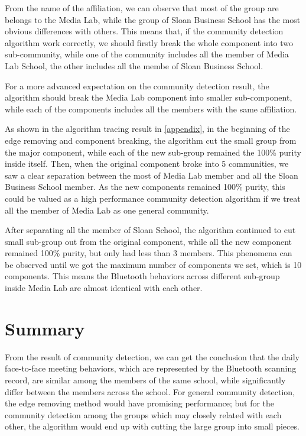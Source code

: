 \documentclass[11pt]{article}
\begin{document}
From the name of the affiliation, we can observe that most of the group are belongs to the Media Lab, while the group of Sloan Business School has the most obvious differences with others. This means that, if the community detection algorithm work correctly, we should firstly break the whole component into two sub-community, while one of the community includes all the member of Media Lab School, the other includes all the membe of Sloan Business School.

For a more advanced expectation on the community detection result, the algorithm should break the Media Lab component into smaller sub-component, while each of the components includes all the members with the same affiliation.

As shown in the algorithm tracing result in \ref{appendix}, in the beginning of the edge removing and component breaking, the algorithm cut the small group from the major component, while each of the new sub-group remained the 100\% purity inside itself. Then, when the original component broke into 5 communities, we saw a clear separation between the most of Media Lab member and all the Sloan Business School member. As the new components remained 100\% purity, this could be valued as a high performance community detection algorithm if we treat all the member of Media Lab as one general community.

After separating all the member of Sloan School, the algorithm continued to cut small sub-group out from the original component, while all the new component remained 100\% purity, but only had less than 3 members. This phenomena can be observed until we got the maximum number of components we set, which is 10 components. This means the Bluetooth behaviors across different sub-group inside Media Lab are almost identical with each other. 

\section{Summary}\label{summary}
From the result of community detection, we can get the conclusion that the daily face-to-face meeting behaviors, which are represented by the Bluetooth scanning record, are similar among the members of the same school, while significantly differ between the members across the school. For general community detection, the edge removing method would have promising performance; but for the community detection among the groups which may closely related with each other, the algorithm would end up with cutting the large group into small pieces.
\end{document}

